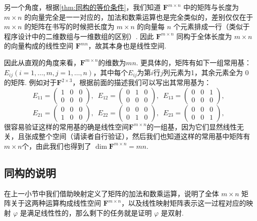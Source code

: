 另一个角度，根据\autoref{thm:同构的等价条件}，我们知道 $\mathbf{F}^{m \times n}$ 中的矩阵与长度为 $m \times n$ 的向量完全是一一对应的，加法和数乘运算也是完全类似的，差别仅仅在于 $m \times n$ 的矩阵在书写的时候把长度为 $m \times n$ 的向量每 $n$ 个元素排成一行（类似于程序设计中的二维数组与一维数组的区别）. 因此 $\mathbf{F}^{m \times n}$ 同构于全体长度为 $m \times n$ 的向量构成的线性空间 $\mathbf{F}^{mn}$，故其本身也是线性空间.

因此从直观的角度来看，$\mathbf{F}^{m\times n}$的维数为$mn$. 更具体的，矩阵有如下一组常用基：$E_{ij}(i=1,\ldots,m,j=1,\ldots,n)$，其中每个$E_{ij}$为第$i$行$j$列元素为1，其余元素全为 $0$ 的矩阵. 例如对于$\mathbf{F}^{2\times 3}$，根据前面的描述我们可以写出其常用基为：
\[E_{11}=\begin{pmatrix}
        1 & 0 & 0 \\
        0 & 0 & 0
    \end{pmatrix},\enspace E_{12}=\begin{pmatrix}
        0 & 1 & 0 \\
        0 & 0 & 0
    \end{pmatrix},\enspace E_{13}=\begin{pmatrix}
        0 & 0 & 1 \\
        0 & 0 & 0
    \end{pmatrix},\]
\[E_{21}=\begin{pmatrix}
        0 & 0 & 0 \\
        1 & 0 & 0
    \end{pmatrix},\enspace E_{22}=\begin{pmatrix}
        0 & 0 & 0 \\
        0 & 1 & 0
    \end{pmatrix},\enspace E_{23}=\begin{pmatrix}
        0 & 0 & 0 \\
        0 & 0 & 1
    \end{pmatrix},\]
很容易验证这样的常用基的确是线性空间$\mathbf{F}^{m\times n}$的一组基，因为它们显然线性无关，且张成整个空间（请读者自行验证），然后我们也知道这样的常用基中矩阵有$m\times n$个，由此我们也得到了 $\dim\mathbf{F}^{m\times n} = mn$.

\subsection{同构的说明}

在上一小节中我们借助映射定义了矩阵的加法和数乘运算，说明了全体 $m \times n$ 矩阵关于这两种运算构成线性空间 $\mathbf{F}^{m\times n}$，以及线性映射矩阵表示这一过程对应的映射 $\varphi$ 是满足线性性的，那么剩下的任务就是证明 $\varphi$ 是双射.

